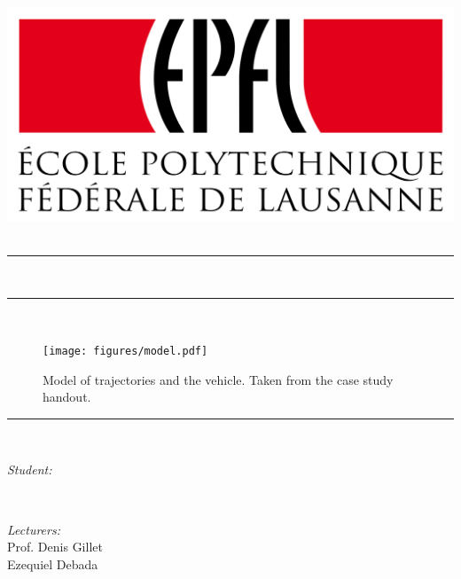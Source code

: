 \begin{titlepage}

\makeatletter
\let\thetitle\@title
\let\theauthor\@author
\let\thedate\@date
\let\thesubtitle\@subtitle
\makeatother

\centering
\vspace*{0.5 cm}

    \includegraphics[width=0.6\linewidth]{figures/EPFL_Logo.png}\\[1.0 cm]	
	\textsc{\Large\thesubtitle}\\[1.0cm]				
	\rule{\linewidth}{0.2 mm} %
	{ \LARGE \thetitle}\\
	\rule{\linewidth}{0.2 mm} \\ %
\begin{figure}[h]
	\centering
	\texttt{[image: figures/model.pdf]}
	\caption{Model of trajectories and the vehicle. Taken from the case study handout.}
	\label{fig:vehicle_model}
\end{figure}
	\rule{\linewidth}{0.2 mm} \\[1.5 cm]

	\begin{minipage}{0.5\textwidth}
		\begin{flushleft} \large
			\emph{{Student}:}\\
			\theauthor
			\end{flushleft}
			\end{minipage}~
			\begin{minipage}{0.4\textwidth}
			\begin{flushright} \large
			\emph{{Lecturers}:} \\	
			Prof. Denis Gillet \\ Ezequiel Debada  \\
		\end{flushright}
	\end{minipage} \\ %
	{\vspace{3cm} \large \thedate}\\[1.5 cm]
	\vfill
\end{titlepage}
